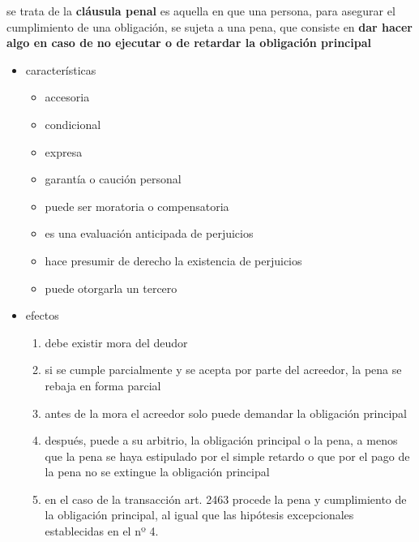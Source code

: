 \documentclass[]{article}
\providecommand{\tightlist}{%
  \setlength{\itemsep}{0pt}\setlength{\parskip}{0pt}}
\begin{document}
\begin{itemize}
\begin{itemize}
\begin{itemize}
\begin{itemize}
\begin{itemize}
\begin{itemize}
            se trata de la \textbf{cláusula penal} es aquella en que una
            persona, para asegurar el cumplimiento de una obligación, se
            sujeta a una pena, que consiste en \textbf{dar hacer algo en
            caso de no ejecutar o de retardar la obligación principal}

            \begin{itemize}
            \tightlist
            \item
              características

              \begin{itemize}
              \tightlist
              \item
                accesoria
              \item
                condicional
              \item
                expresa
              \item
                garantía o caución personal
              \item
                puede ser moratoria o compensatoria
              \item
                es una evaluación anticipada de perjuicios
              \item
                hace presumir de derecho la existencia de perjuicios
              \item
                puede otorgarla un tercero
              \end{itemize}
            \item
              efectos

              \begin{enumerate}
              \def\labelenumi{\arabic{enumi}.}
              \tightlist
              \item
                debe existir mora del deudor
              \item
                si se cumple parcialmente y se acepta por parte del
                acreedor, la pena se rebaja en forma parcial
              \item
                antes de la mora el acreedor solo puede demandar la
                obligación principal
              \item
                después, puede a su arbitrio, la obligación principal o
                la pena, a menos que la pena se haya estipulado por el
                simple retardo o que por el pago de la pena no se
                extingue la obligación principal
              \item
                en el caso de la transacción art. 2463 procede la pena y
                cumplimiento de la obligación principal, al igual que
                las hipótesis excepcionales establecidas en el nº 4.
              \end{enumerate}
            \end{itemize}
          \end{itemize}
        \end{itemize}
      \end{itemize}


\end{itemize}
\end{itemize}
\end{itemize}
\end{document}

